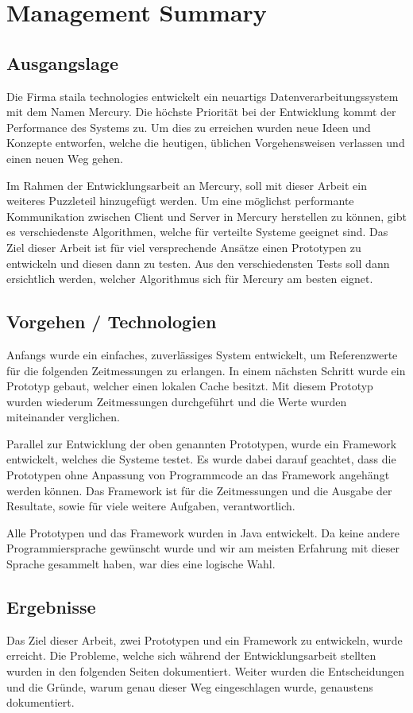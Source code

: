\chapter*{Management Summary}

\section*{Ausgangslage}
Die Firma staila technologies ent\-wick\-elt ein neuartigs Daten\-ver\-arbeitungs\-system mit dem Namen Mercury. Die höchste Priorität bei der Entwicklung kommt der Performance des Systems zu. Um dies zu erreichen wurden neue Ideen und Konzepte entworfen, welche die heutigen, üblichen Vorgehensweisen verlassen und einen neuen Weg gehen.

Im Rahmen der Entwicklungsarbeit an Mercury, soll mit dieser Arbeit ein weiteres Puzzleteil hinzugefügt werden. Um eine möglichst performante Kommunikation zwischen Client und Server in Mercury herstellen zu können, gibt es verschiedenste Algorithmen, welche für verteilte Systeme geeignet sind. Das Ziel dieser Arbeit ist für viel versprechende Ansätze einen Prototypen zu entwickeln und diesen dann zu testen. Aus den verschiedensten Tests soll dann ersichtlich werden, welcher Algorithmus sich für Mercury am besten eignet.

\section*{Vorgehen / Technologien}
Anfangs wurde ein einfaches, zuverlässiges System entwickelt, um Referenzwerte für die folgenden Zeitmessungen zu erlangen. In einem nächsten Schritt wurde ein Prototyp gebaut, welcher einen lokalen Cache besitzt. Mit diesem Prototyp wurden wiederum Zeitmessungen durchgeführt und die Werte wurden miteinander verglichen.

Parallel zur Ent\-wick\-lung der oben ge\-nannten Pro\-to\-typ\-en, wur\-de ein Frame\-work entwickelt, welches die Systeme testet. Es wurde dabei darauf geachtet, dass die Prototypen ohne Anpassung von Programmcode an das Framework angehängt werden können. Das Framework ist für die Zeitmessungen und die Ausgabe der Resultate, sowie für viele weitere Aufgaben, verantwortlich.

Alle Prototypen und das Framework wurden in Java entwickelt. Da keine andere Programmiersprache gewünscht wurde und wir am meisten Erfahrung mit dieser Sprache gesammelt haben, war dies eine logische Wahl.
\section*{Ergebnisse}
Das Ziel dieser Arbeit, zwei Prototypen und ein Framework zu entwickeln, wurde erreicht. Die Probleme, welche sich während der Entwicklungsarbeit stellten wurden in den folgenden Seiten dokumentiert. Weiter wurden die Entscheidungen und die Gründe, warum genau dieser Weg eingeschlagen wurde, genaustens dokumentiert.

